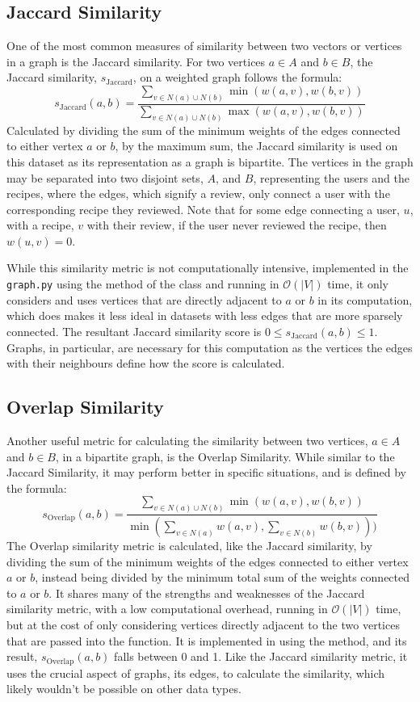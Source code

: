 \documentclass[fontsize=11pt]{article}
\begin{document}
\subsection{Jaccard Similarity}
One of the most common measures of similarity between two vectors or vertices in a graph is the Jaccard similarity. For two vertices $a \in A$ and $b \in B$, the Jaccard similarity, $s_{\text{Jaccard}}$, on a weighted graph follows the formula:
\[
s_{\text{Jaccard}}(a, b) = \frac{\sum_{v \in N(a) \cup N(b)}\min(w(a, v), w(b, v))}{\sum_{v \in N(a) \cup N(b)}\max(w(a, v), w(b, v))}
\]
Calculated by dividing the sum of the minimum weights of the edges connected to either vertex $a$ or $b$, by the maximum sum, the Jaccard similarity is used on this dataset as its representation as a graph is bipartite. The vertices in the graph may be separated into two disjoint sets, $A$, and $B$, representing the users and the recipes, where the edges, which signify a review, only connect a user with the corresponding recipe they reviewed. Note that for some edge connecting a user, $u$, with a recipe, $v$ with their review, if the user never reviewed the recipe, then $w(u, v) = 0$. 

While this similarity metric is not computationally intensive, implemented in the \texttt{graph.py} using the  method of the  class and running in $\mathcal{O}(\lvert V \rvert)$ time, it only considers and uses vertices that are directly adjacent to $a$ or $b$ in its computation, which does makes it less ideal in datasets with less edges that are more sparsely connected. The resultant Jaccard similarity score is $0 \leq s_{\text{Jaccard}}(a, b) \leq 1$. Graphs, in particular, are necessary for this computation as the vertices the edges with their neighbours define how the score is calculated.

\subsection{Overlap Similarity}
Another useful metric for calculating the similarity between two vertices, $a \in A$ and $b \in B$, in a bipartite graph, is the Overlap Similarity. While similar to the Jaccard Similarity, it may perform better in specific situations, and is defined by the formula:
\[
s_{\text{Overlap}}(a, b) = \frac{\sum_{v \in N(a) \cup N(b)}\min(w(a, v), w(b, v))}{\min(\sum_{v \in N(a)}w(a, v), \sum_{v \in N(b)}w(b, v)))}
\]
The Overlap similarity metric is calculated, like the Jaccard similarity, by dividing the sum of the minimum weights of the edges connected to either vertex $a$ or $b$, instead being divided by the minimum total sum of the weights connected to $a$ or $b$. It shares many of the strengths and weaknesses of the Jaccard similarity metric, with a low computational overhead, running in $\mathcal{O}(\lvert V \rvert)$ time, but at the cost of only considering vertices directly adjacent to the two vertices that are passed into the function. It is implemented in using the  method, and its result, $s_{\text{Overlap}}(a, b)$ falls between 0 and 1. Like the Jaccard similarity metric, it uses the crucial aspect of graphs, its edges, to calculate the similarity, which likely wouldn't be possible on other data types.
\end{document}

